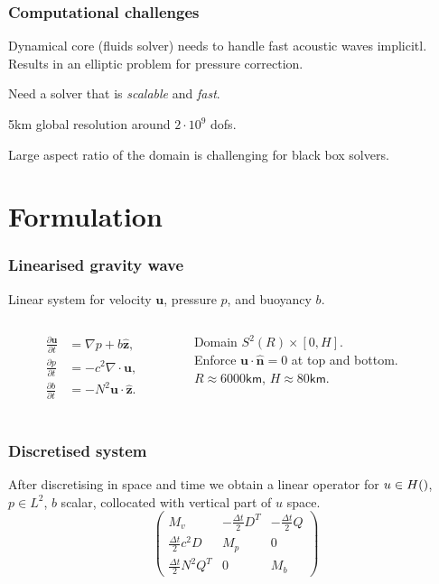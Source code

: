 \documentclass[presentation]{beamer}
\renewcommand{\vec}[1]{\ensuremath{\boldsymbol{#1}}}
\newcommand{\ddt}[1]{\frac{\partial #1}{\partial t}}
\newcommand{\zhat}{\hat{\vec{z}}}
\let\div\relax
\DeclareMathOperator{\div}{div}
\begin{document}
\begin{frame}
  \frametitle{Computational challenges}
  Dynamical core (fluids solver) needs to handle fast acoustic waves
  implicitl.  Results in an elliptic problem for pressure correction.

  Need a solver that is \emph{scalable} and \emph{fast}.

  5km global resolution around $2 \cdot 10^9$ dofs.

  Large aspect ratio of the domain is challenging for black box solvers.
\end{frame}

\section{Formulation}

\begin{frame}
  \frametitle{Linearised gravity wave}
  Linear system for velocity $\vec{u}$, pressure $p$, and buoyancy $b$.
  \begin{columns}
    \begin{column}{0.4\textwidth}
      \begin{align*}
        \ddt{\vec{u}} &= \nabla p + b \zhat, \\
        \ddt{p} &= -c^2 \nabla\cdot \vec{u}, \\
        \ddt{b} &= -N^2\vec{u}\cdot\zhat.\\
      \end{align*}
    \end{column}
    \begin{column}{0.6\textwidth}
      Domain $S^2(R) \times [0, H]$.\\
      Enforce $\vec{u}\cdot \hat{\vec{n}} = 0$ at top and bottom.\\
      $R\approx 6000\textsf{km}$, $H\approx 80\textsf{km}$.
    \end{column}
  \end{columns}
\end{frame}

\begin{frame}
  \frametitle{Discretised system}
  After discretising in space and time we obtain a linear operator for
  $u \in H(\div)$, $p \in L^2$, $b$ scalar, collocated with
  vertical part of $u$ space.
\begin{equation*}
\begin{pmatrix}
  M_v & 
    -\frac{\Delta t}{2}D^T & 
    -\frac{\Delta t}{2}Q\\[1ex]
  \frac{\Delta t}{2}c^2D & M_p & 0\\[1ex]
  \frac{\Delta t}{2}N^2Q^T & 0 & M_b
\end{pmatrix}
\end{equation*}
\end{frame}
\end{document}

